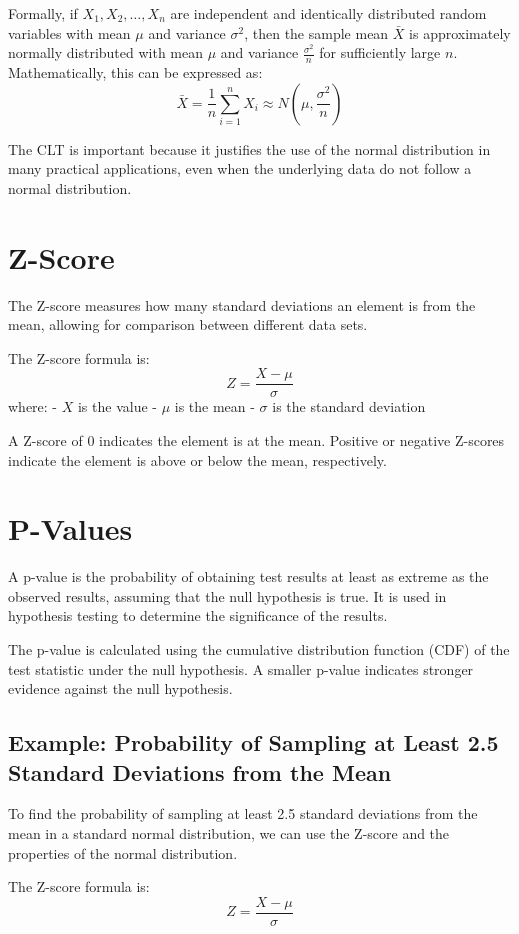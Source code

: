 \documentclass{article}
\begin{document}
Formally, if \(X_1, X_2, \ldots, X_n\) are independent and identically distributed random variables with mean \(\mu\) and variance \(\sigma^2\), then the sample mean \(\bar{X}\) is approximately normally distributed with mean \(\mu\) and variance \(\frac{\sigma^2}{n}\) for sufficiently large \(n\). Mathematically, this can be expressed as:
\[
\bar{X} = \frac{1}{n} \sum_{i=1}^{n} X_i \approx N\left(\mu, \frac{\sigma^2}{n}\right)
\]

The CLT is important because it justifies the use of the normal distribution in many practical applications, even when the underlying data do not follow a normal distribution.

\section{Z-Score}
The Z-score measures how many standard deviations an element is from the mean, allowing for comparison between different data sets.

The Z-score formula is:
\[
Z = \frac{X - \mu}{\sigma}
\]
where:
- \(X\) is the value
- \(\mu\) is the mean
- \(\sigma\) is the standard deviation

A Z-score of 0 indicates the element is at the mean. Positive or negative Z-scores indicate the element is above or below the mean, respectively.

\section{P-Values}
A p-value is the probability of obtaining test results at least as extreme as the observed results, assuming that the null hypothesis is true. It is used in hypothesis testing to determine the significance of the results.

The p-value is calculated using the cumulative distribution function (CDF) of the test statistic under the null hypothesis. A smaller p-value indicates stronger evidence against the null hypothesis.

\subsection{Example: Probability of Sampling at Least 2.5 Standard Deviations from the Mean}
To find the probability of sampling at least 2.5 standard deviations from the mean in a standard normal distribution, we can use the Z-score and the properties of the normal distribution.

The Z-score formula is:
\[
Z = \frac{X - \mu}{\sigma}
\]
\end{document}
